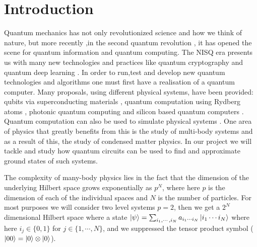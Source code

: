 \documentclass{physics_article}
\date{}
\begin{document}
	\maketitle
	\tableofcontents

	\section{Introduction \label{intro}}
	Quantum mechanics has not only revolutionized science and how we think of nature, but more recently ,in the second quantum revolution \cite{https://doi.org/10.48550/arxiv.quant-ph/0206091}, it has opened the scene for quantum information and quantum computing. The NISQ era \cite{Preskill2018quantumcomputingin} presents us with many new technologies and practices like quantum cryptography \cite{bernstein_buchmann_dahmen_2009} and quantum deep learning \cite{https://doi.org/10.48550/arxiv.1711.02038}. In order to run,test and develop new quantum technologies and algorithms one must first have a realisation of a quantum computer. Many proposals, using different physical systems, have been provided: qubits via superconducting materials \cite{PhysRevLett.85.2208, nakamura_pashkin_tsai_1999}, quantum computation using Rydberg atoms \cite{PhysRevLett.74.4091,PhysRevLett.75.4714}, photonic quantum computing \cite{knill_laflamme_milburn_2001,doi:10.1126/science.abe8770} and silicon based quantum computers \cite{kane_1998,madzik_asaad_youssry_joecker_rudinger_nielsen_young_proctor_baczewski_laucht_et}. Quantum computation can also be used to simulate physical systems \cite{feynman_1982}. One area of physics that greatly benefits from this is the study of multi-body systems and as a result of this, the study of condensed matter physics. In our project we will tackle and study how quantum circuits can be used to find and approximate ground states of such systems.

	The complexity of many-body physics lies in the fact that the dimension of the underlying Hilbert space grows exponentially as $p^N$, where here $p$ is the dimension of each of the individual spaces and $N$ is the number of particles. For most purposes we will consider two level systems $p = 2$, then we get a $2^N$ dimensional Hilbert space where a state $\ket{\psi} = \sum_{i_1,\cdots,i_N} a_{i_1 \cdots i_N}\ket{i_1 \cdots i_N}$ where here $i_j \in \{0,1\}$ for $j\in\{1,\cdots,N\}$, and we suppressed the tensor product symbol ($\ket{00} = \ket{0}\otimes\ket{0}$).
\end{document}
